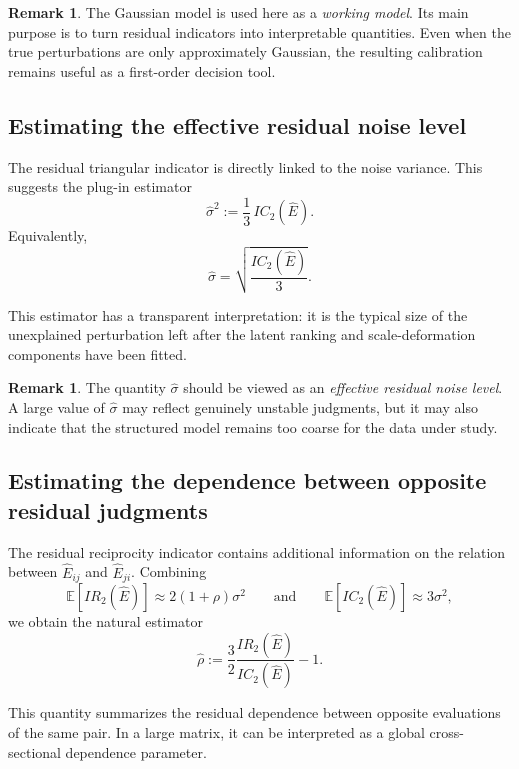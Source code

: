 \documentclass[11pt]{amsart}
\theoremstyle{definition}
\newtheorem{remark}[definition]{Remark}
\theoremstyle{plain}
\numberwithin{equation}{section}
\begin{document}
\begin{remark}
The Gaussian model is used here as a \emph{working model}. Its main purpose is to turn residual indicators into interpretable quantities. Even when the true perturbations are only approximately Gaussian, the resulting calibration remains useful as a first-order decision tool.
\end{remark}

\subsection{Estimating the effective residual noise level}

The residual triangular indicator is directly linked to the noise variance. This suggests the plug-in estimator
\begin{equation}\label{eq:sigmahatcorr}
\widehat\sigma^2:=\frac{1}{3}\,IC_2(\widehat E).
\end{equation}
Equivalently,
\[
\widehat\sigma=\sqrt{\frac{IC_2(\widehat E)}{3}}.
\]

This estimator has a transparent interpretation: it is the typical size of the unexplained perturbation left after the latent ranking and scale-deformation components have been fitted.

\begin{remark}
The quantity $\widehat\sigma$ should be viewed as an \emph{effective residual noise level}. A large value of $\widehat\sigma$ may reflect genuinely unstable judgments, but it may also indicate that the structured model remains too coarse for the data under study.
\end{remark}

\subsection{Estimating the dependence between opposite residual judgments}

The residual reciprocity indicator contains additional information on the relation between $\widehat E_{ij}$ and $\widehat E_{ji}$. Combining
\[
\mathbb E[IR_2(\widehat E)]\approx 2(1+\rho)\sigma^2
\qquad\text{and}\qquad
\mathbb E[IC_2(\widehat E)]\approx 3\sigma^2,
\]
we obtain the natural estimator
\begin{equation}\label{eq:rhohatcorr}
\widehat\rho
:=
\frac{3}{2}\frac{IR_2(\widehat E)}{IC_2(\widehat E)}-1.
\end{equation}

This quantity summarizes the residual dependence between opposite evaluations of the same pair. In a large matrix, it can be interpreted as a global cross-sectional dependence parameter.
\end{document}
